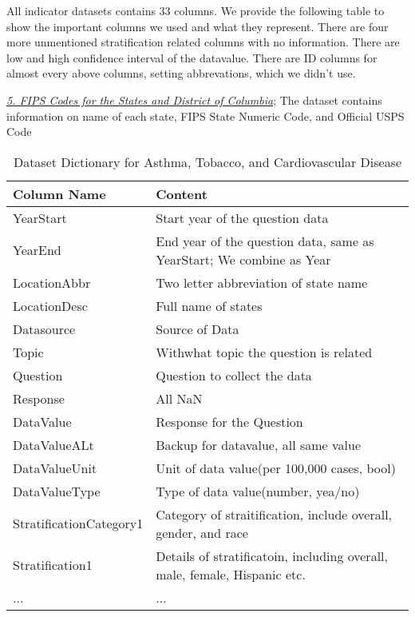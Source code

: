 \documentclass{article}
\begin{document}
All indicator datasets contains 33 columns. We provide the following table to show the important columns we used and what they represent. There are four more unmentioned stratification related columns with no information. There are low and high confidence interval of the datavalue. There are ID columns for almost every above columns, setting abbrevations, which we didn't use.

\href{https://www.census.gov/library/reference/code-lists/ansi/ansi-codes-for-states.html}{\textit{5. FIPS Codes for the States and District of Columbia}}; The dataset contains information on name of each state, FIPS State Numeric Code, and Official USPS Code

\begin{table}[h]
\caption{\label{tab:questionIdTable2}Dataset Dictionary for Asthma, Tobacco, and Cardiovascular Disease}
\centering
\begin{tabular}{m|l}
Column Name & Content \\\hline
YearStart & Start year of the question data \\
YearEnd & End year of the question data, same as YearStart; We combine as Year \\
LocationAbbr & Two letter abbreviation of state name \\
LocationDesc & Full name of states \\
Datasource & Source of Data \\
Topic & Withwhat topic the question is related \\
Question & Question to collect the data \\
Response & All NaN \\
DataValue & Response for the Question \\
DataValueALt & Backup for datavalue, all same value \\
DataValueUnit & Unit of data value(per 100,000 cases, bool) \\
DataValueType & Type of data value(number, yea/no)\\
StratificationCategory1 & Category of straitification, include overall, gender, and race \\
Stratification1 & Details of stratificatoin, including overall, male, female, Hispanic etc. \\
... & ...

\end{tabular}
\end{table}
\end{document}
